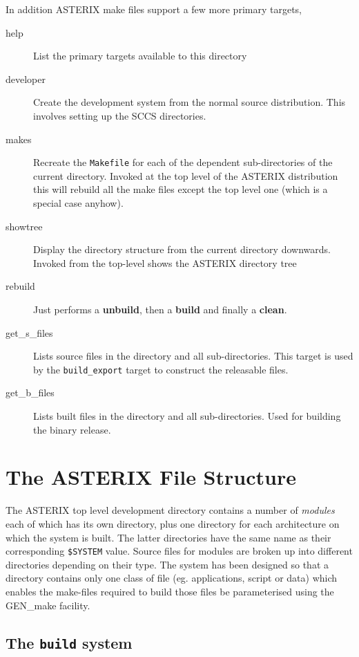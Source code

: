 In addition ASTERIX make files support a few more primary targets,
\begin{description}
\item[help] List the primary targets available to this directory
\item[developer] Create the development system from the normal source
  distribution. This involves setting up the SCCS directories.
\item[makes] Recreate the \verb+Makefile+ for each of the dependent 
  sub-directories of the current directory. Invoked at the top level
  of the ASTERIX distribution this will rebuild all the make files except the
  top level one (which is a special case anyhow).
\item[showtree] Display the directory structure from the current directory
  downwards. Invoked from the top-level shows the ASTERIX directory tree
\item[rebuild] Just performs a {\bf unbuild}, then a {\bf build} and
  finally a {\bf clean}.
\item[get\_s\_files] Lists source files in the directory and all
  sub-directories. This target is used by the \verb+build_export+ target
  to construct the releasable files.
\item[get\_b\_files] Lists built files in the directory and all sub-directories.
  Used for building the binary release.
\end{description}




\section{The ASTERIX File Structure}

The ASTERIX top level development directory contains a number of {\em modules}
each of which has its own directory, plus one directory for each architecture
on which the system is built. The latter directories have the same name as
their corresponding \verb+$SYSTEM+ value. Source files for modules are broken
up into different directories depending on their type. The system has been
designed so that a directory contains only one class of file (eg.
applications, script or data) which enables the make-files required to build
those files be parameterised using the GEN\_make facility. 

\subsection{The {\tt build} system}

